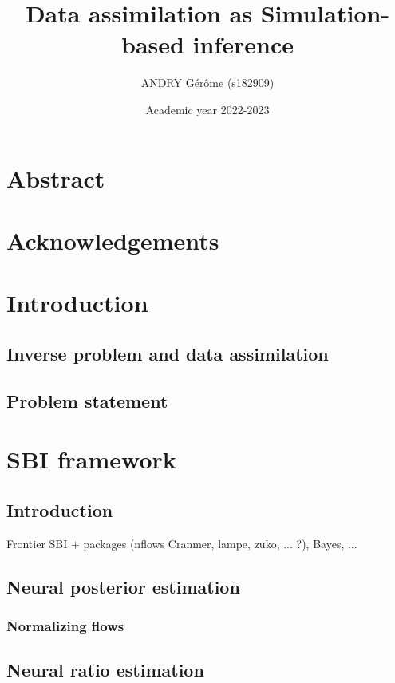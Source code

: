 \documentclass[a4paper, 12pt]{article}
\title{Data assimilation as Simulation-based inference}
\author{ANDRY Gérôme (s182909)}
\date{Academic year 2022-2023}
\begin{document}
\maketitle

\newpage
\section*{Abstract}


\newpage
\section*{Acknowledgements}

\newpage
\tableofcontents
\newpage


\section{Introduction}
\subsection{Inverse problem and data assimilation}

\subsection{Problem statement}

\section{SBI framework}
\subsection{Introduction}
Frontier SBI + packages (nflows Cranmer, lampe, zuko, ... ?), Bayes, ...
\subsection{Neural posterior estimation}
\subsubsection{Normalizing flows}
\subsection{Neural ratio estimation}
\end{document}
